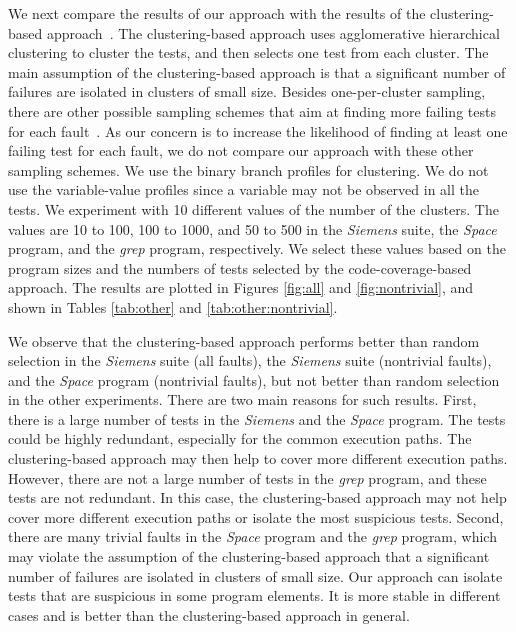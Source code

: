 \documentclass{sig-alternate}
\begin{document}
We next compare the results of our approach with the results of the
clustering-based approach~\cite{Dickinson01a}. The clustering-based
approach uses agglomerative hierarchical clustering to cluster the
tests, and then selects one test from each cluster. The main
assumption of the clustering-based approach is that a significant
number of failures are isolated in clusters of small size. Besides
one-per-cluster sampling, there are other possible sampling schemes
that aim at finding more failing tests for each
fault~\cite{Dickinson01b}. As our concern is to increase the
likelihood of finding at least one failing test for each fault, we
do not compare our approach with these other sampling schemes. We
use the binary branch profiles for clustering. We do not use the
variable-value profiles since a variable may not be observed in all
the tests. We experiment with 10 different values of the number of
the clusters. The values are 10 to 100, 100 to 1000, and 50 to 500
in the \emph{Siemens} suite, the \emph{Space} program, and the
\emph{grep} program, respectively. We select these values based on
the program sizes and the numbers of tests selected by the
code-coverage-based approach. The results are plotted in Figures
\ref{fig:all} and \ref{fig:nontrivial}, and shown in Tables
\ref{tab:other} and \ref{tab:other:nontrivial}.

We observe that the clustering-based approach performs better than
random selection in the \emph{Siemens} suite (all faults), the
\emph{Siemens} suite (nontrivial faults), and the \emph{Space}
program (nontrivial faults), but not better than random selection in
the other experiments. There are two main reasons for such results.
First, there is a large number of tests in the \emph{Siemens} and
the \emph{Space} program. The tests could be highly redundant,
especially for the common execution paths. The clustering-based
approach may then help to cover more different execution paths.
However, there are not a large number of tests in the \emph{grep}
program, and these tests are not redundant. In this case, the
clustering-based approach may not help cover more different
execution paths or isolate the most suspicious tests. Second, there
are many trivial faults in the \emph{Space} program and the
\emph{grep} program, which may violate the assumption of the
clustering-based approach that a significant number of failures are
isolated in clusters of small size. Our approach can isolate tests
that are suspicious in some program elements. It is more stable in
different cases and is better than the clustering-based approach in
general.
\end{document}

